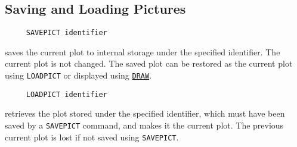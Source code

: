 \subsection{Saving and Loading Pictures}

\begin{verbatim}
     SAVEPICT identifier
\end{verbatim}
\label{logoturtle:savepict}
saves the current plot to internal storage under the specified
identifier.  The current plot is not changed.  The saved plot can be
restored as the current plot using \texttt{LOADPICT} or displayed
using \hyperref[logoturtle:draw]{\texttt{DRAW}}.

\begin{verbatim}
     LOADPICT identifier
\end{verbatim}
retrieves the plot stored under the specified identifier, which must
have been saved by a \texttt{SAVEPICT} command, and makes it the
current plot.  The previous current plot is lost if not saved using
\texttt{SAVEPICT}.
